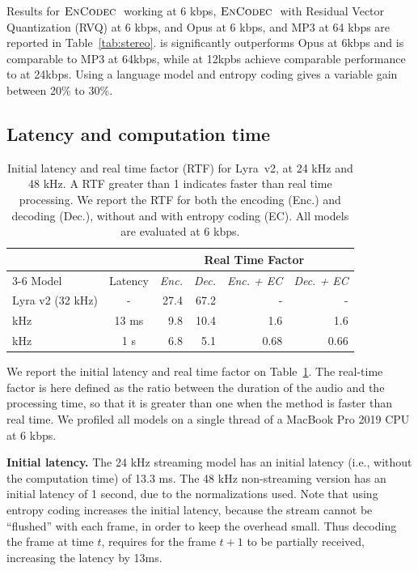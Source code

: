 Results for $\textsc{EnCodec}~$ working at 6 kbps, $\textsc{EnCodec}~$ with Residual Vector Quantization (RVQ) at 6 kbps, and Opus at 6 kbps, and MP3 at 64 kbps are reported in Table~\ref{tab:stereo}. \encodec is significantly outperforms Opus at 6kbps and is comparable to MP3 at 64kbps, while \encodec at 12kpbs achieve comparable performance to \encodec at 24kbps. Using a language model and entropy coding gives a variable gain
between 20\% to 30\%.

\subsection{Latency and computation time}
\label{sec:latency}


\begin{table}
  \centering
  \caption{Initial latency and real time factor (RTF) for Lyra~v2, \encodec at 24 kHz and 48 kHz. A RTF greater than 1 indicates faster than real time processing.
  We report the RTF for both the encoding (Enc.) and decoding (Dec.), without and 
  with entropy coding (EC). All models are evaluated at 6 kbps.
  \label{tab:latency}}
  \begin{tabular}{lcrrrr}
    \toprule
    & & \multicolumn{4}{c}{Real Time Factor}\\
    \cmidrule{3-6}
    Model & Latency & \emph{Enc.} & \emph{Dec.} &  \emph{Enc. + EC} & \emph{Dec. + EC}  \\
    \midrule
    Lyra v2 (32 kHz) & - & 27.4 & 67.2 & - & - \\
    \midrule
    \encodec 24 kHz & 13 ms & 9.8 & 10.4 & 1.6 & 1.6\\
    \encodec 48 kHz & 1 s & 6.8 & 5.1 & 0.68 & 0.66\\
    \bottomrule
    \end{tabular}
\end{table}

We report the initial latency and real time factor on Table~\ref{tab:latency}.
The real-time factor is here defined as the ratio between the duration of the audio and the processing time, so that it is greater than one when the method is faster than real time. We profiled all models on a single thread of a MacBook Pro 2019 CPU at 6 kbps. 

{\noindent \bf Initial latency.}
The 24 kHz streaming \encodec{} model has an initial latency (i.e., without the computation time) of 13.3 ms.
The 48 kHz non-streaming version has an initial latency of 1 second, due to the normalizations used.
Note that using entropy coding increases the initial latency, because the stream
cannot be ``flushed'' with each frame, in order to keep the overhead small. 
Thus decoding the frame at time $t$, requires for the frame $t + 1$ to be partially received, increasing the latency by 13ms.

